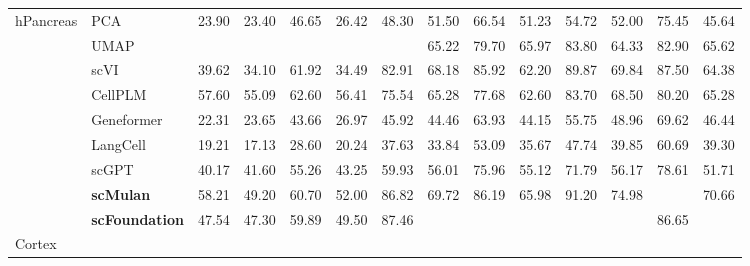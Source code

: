 \begin{table}[htbp]
\begin{tabular}{llcccccccccccc}
    \multirow{9}{*}{hPancreas}

      & PCA      &   23.90 &   23.40 &   46.65 &   26.42 &   48.30 &   51.50 &   66.54 &   51.23 &   54.72 &   52.00 &   75.45 &   45.64  \\
      & UMAP      & \cellcolor{gray!25}{65.11} & \cellcolor{gray!25}{55.70} & \cellcolor{gray!25}{72.39} & \cellcolor{gray!25}{59.49} & \cellcolor{gray!25}{87.83} &   65.22 &   79.70 &   65.97 &   83.80 &   64.33 &   82.90 &   65.62  \\
      & scVI      &   39.62 &   34.10 &   61.92 &   34.49 &   82.91 &   68.18 &   85.92 &   62.20 &   89.87 &   69.84 &   87.50 &   64.38  \\
      & CellPLM      &   57.60 &   55.09 &   62.60 &   56.41 &   75.54 &   65.28 &   77.68 &   62.60 &   83.70 &   68.50 &   80.20 &   65.28  \\
      & Geneformer      &   22.31 &   23.65 &   43.66 &   26.97 &   45.92 &   44.46 &   63.93 &   44.15 &   55.75 &   48.96 &   69.62 &   46.44  \\
      & LangCell      &   19.21 &   17.13 &   28.60 &   20.24 &   37.63 &   33.84 &   53.09 &   35.67 &   47.74 &   39.85 &   60.69 &   39.30  \\
      & scGPT      &   40.17 &   41.60 &   55.26 &   43.25 &   59.93 &   56.01 &   75.96 &   55.12 &   71.79 &   56.17 &   78.61 &   51.71  \\
      & \cellcolor{gray!25}\textbf{scMulan}      &   58.21 &   49.20 &   60.70 &   52.00 &   86.82 &   69.72 &   86.19 &   65.98 &   91.20 &   74.98 & \cellcolor{gray!25}{88.63} &   70.66  \\
      & \cellcolor{gray!25}\textbf{scFoundation}      &   47.54 &   47.30 &   59.89 &   49.50 &   87.46 & \cellcolor{gray!25}{75.30} & \cellcolor{gray!25}{88.76} & \cellcolor{gray!25}{71.87} & \cellcolor{gray!25}{93.62} & \cellcolor{gray!25}{76.47} &   86.65 & \cellcolor{gray!25}{72.88}  \\
    \midrule

    \multirow{9}{*}{Cortex}


\end{tabular}
\end{table}
